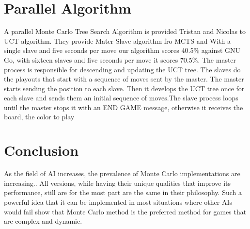 \documentclass[11pt]{article}
\begin{document}
\section{Parallel Algorithm}
A parallel Monte Carlo Tree Search Algorithm is provided Tristan and Nicolas to UCT algorithm\cite{cazenave2008parallel}. They provide Mater Slave algorithm fro MCTS and With a single slave and five seconds per move our algorithm scores 40.5\% against GNU Go, with sixteen slaves and five seconds per move it scores 70.5\%. The master process is responsible for descending and updating the UCT tree. The slaves do the playouts  that start with a sequence of moves sent by the master. The master starts sending the position to each slave. Then it develops the UCT tree once for each slave and sends them an initial sequence of moves.The slave process loops until the master stops it with an END GAME message, otherwise it receives the board, the color to play

\section{Conclusion}

As the field of AI increases, the prevalence of Monte Carlo implementations are increasing.. All versions, while having their unique qualities that improve its performance, still are for the most part are the same in their philosophy. Such a powerful idea that it can be implemented in most situations where other AIs would fail show that Monte Carlo method is the preferred method for games that are complex and dynamic. 





\end{document}
